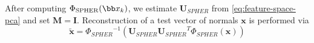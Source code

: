 After computing $\spher$, we estimate $\mathbf{U}_{SPHER}$ from 
\cref{eq:feature-space-pca} and set $\mathbf{M} = \mathbf{I}$. Reconstruction
of a test vector of normals $\mathbf{x}$ is performed via
\begin{equation}\label{eq:spher-reconstruction}
   \tilde{\mathbf{x}} = {\Phi_{SPHER}}^{-1} \left( \mathbf{U}_{SPHER} {\mathbf{U}_{SPHER}}^T \Phi_{SPHER}(\mathbf{x}) \right)
\end{equation}
